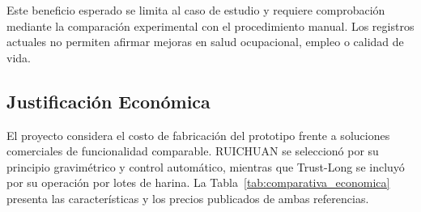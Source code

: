 Este beneficio esperado se limita al caso de estudio y requiere
comprobación mediante la comparación experimental con el procedimiento
manual. Los registros actuales no permiten afirmar mejoras en salud
ocupacional, empleo o calidad de vida.

\subsection{Justificación Económica}
\label{subsec:justificacion_economica}

El proyecto considera el costo de fabricación del prototipo
frente a soluciones comerciales de funcionalidad comparable. RUICHUAN se
seleccionó por su principio gravimétrico y control automático, mientras que
Trust-Long se incluyó por su operación por lotes de harina. La
Tabla~\ref{tab:comparativa_economica} presenta las características y los
precios publicados de ambas referencias.


